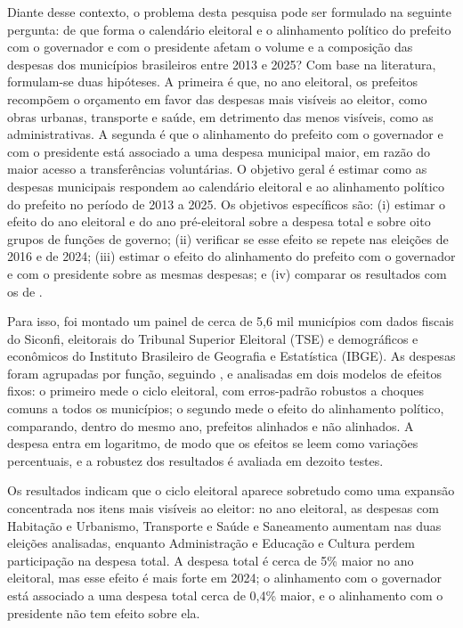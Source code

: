 Diante desse contexto, o problema desta pesquisa pode ser formulado na seguinte pergunta: de que forma o calendário eleitoral e o alinhamento político do prefeito com o governador e com o presidente afetam o volume e a composição das despesas dos municípios brasileiros entre 2013 e 2025? Com base na literatura, formulam-se duas hipóteses. A primeira é que, no ano eleitoral, os prefeitos recompõem o orçamento em favor das despesas mais visíveis ao eleitor, como obras urbanas, transporte e saúde, em detrimento das menos visíveis, como as administrativas. A segunda é que o alinhamento do prefeito com o governador e com o presidente está associado a uma despesa municipal maior, em razão do maior acesso a transferências voluntárias. O objetivo geral é estimar como as despesas municipais respondem ao calendário eleitoral e ao alinhamento político do prefeito no período de 2013 a 2025. Os objetivos específicos são: (i) estimar o efeito do ano eleitoral e do ano pré-eleitoral sobre a despesa total e sobre oito grupos de funções de governo; (ii) verificar se esse efeito se repete nas eleições de 2016 e de 2024; (iii) estimar o efeito do alinhamento do prefeito com o governador e com o presidente sobre as mesmas despesas; e (iv) comparar os resultados com os de \textcite{sakurai2009}.

Para isso, foi montado um painel de cerca de 5,6 mil municípios com dados fiscais do Siconfi, eleitorais do Tribunal Superior Eleitoral (TSE) e demográficos e econômicos do Instituto Brasileiro de Geografia e Estatística (IBGE). As despesas foram agrupadas por função, seguindo \textcite{sakurai2009}, e analisadas em dois modelos de efeitos fixos: o primeiro mede o ciclo eleitoral, com erros-padrão robustos a choques comuns a todos os municípios; o segundo mede o efeito do alinhamento político, comparando, dentro do mesmo ano, prefeitos alinhados e não alinhados. A despesa entra em logaritmo, de modo que os efeitos se leem como variações percentuais, e a robustez dos resultados é avaliada em dezoito testes.

Os resultados indicam que o ciclo eleitoral aparece sobretudo como uma expansão concentrada nos itens mais visíveis ao eleitor: no ano eleitoral, as despesas com Habitação e Urbanismo, Transporte e Saúde e Saneamento aumentam nas duas eleições analisadas, enquanto Administração e Educação e Cultura perdem participação na despesa total. A despesa total é cerca de 5\% maior no ano eleitoral, mas esse efeito é mais forte em 2024; o alinhamento com o governador está associado a uma despesa total cerca de 0,4\% maior, e o alinhamento com o presidente não tem efeito sobre ela.

